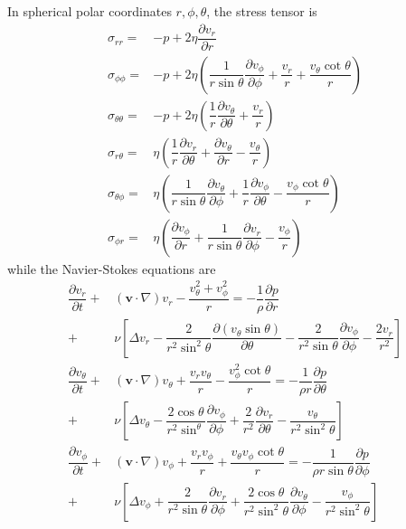 \documentclass[conference]{IEEEtran}
\theoremstyle{definition}
\theoremstyle{remark}
\begin{document}
    In spherical polar coordinates $r, \phi, \theta$, the stress tensor is
    \begin{equation}
        \begin{aligned}
            \sigma_{rr} =& -p + 2\eta \dfrac{\partial v_r}{\partial r} \\
            \sigma_{\phi\phi} =& -p + 2\eta \left( \dfrac1{r\sin \theta} \dfrac{\partial v_\phi}{\partial \phi} + \dfrac{v_r}{r} + \dfrac{v_\theta \cot \theta}{r} \right) \\
            \sigma_{\theta\theta} =& -p + 2\eta \left( \dfrac1r \dfrac{\partial v_\theta}{\partial \theta} + \dfrac{v_r}{r} \right) \\
            \sigma_{r\theta} =& \eta \left( \dfrac1r \dfrac{\partial v_r}{\partial \theta} + \dfrac{\partial v_\theta}{\partial r} - \dfrac{v_\theta}{r} \right) \\
            \sigma_{\theta\phi} =& \eta \left( \dfrac1{r\sin \theta} \dfrac{\partial v_\theta}{\partial \phi} + \dfrac1r \dfrac{\partial v_\phi}{\partial \theta} - \dfrac{v_\phi \cot \theta}{r} \right) \\
            \sigma_{\phi r} =& \eta \left( \dfrac{\partial v_\phi}{\partial r} + \dfrac1{r \sin \theta}\dfrac{\partial v_r}{\partial \phi} - \dfrac{v_\phi}{r} \right)
        \end{aligned}
    \end{equation}
    while the Navier-Stokes equations are
    \begin{align}
        \dfrac{\partial v_r}{\partial t} +& (\mathbf{v} \cdot \nabla) v_r - \dfrac{v_\theta^2 + v_\phi^2}r = -\dfrac1\rho \dfrac{\partial p}{\partial r} \nonumber \\
        +& \nu \left[ \Delta v_r - \dfrac2{r^2\sin^2\theta} \dfrac{\partial (v_\theta \sin\theta)}{\partial \theta} - \dfrac2{r^2\sin\theta} \dfrac{\partial v_\phi}{\partial \phi} - \dfrac{2v_r}{r^2} \right] \nonumber \\
        \dfrac{\partial v_\theta}{\partial t} +& (\mathbf{v} \cdot \nabla) v_\theta + \dfrac{v_r v_\theta}r - \dfrac{v_\phi^2 \cot \theta}r = -\dfrac1{\rho r} \dfrac{\partial p}{\partial \theta} \\
        +& \nu \left[ \Delta v_\theta - \dfrac{2\cos\theta}{r^2\sin^\theta} \dfrac{\partial v_\phi}{\partial \phi} + \dfrac2{r^2} \dfrac{\partial v_r}{\partial \theta} - \dfrac{v_\theta}{r^2 \sin^2 \theta} \right] \nonumber \\
        \dfrac{\partial v_\phi}{\partial t} +& (\mathbf{v} \cdot \nabla) v_\phi + \dfrac{v_r v_\phi}{r} + \dfrac{v_\theta v_\phi \cot \theta}r = -\dfrac1{\rho r \sin \theta} \dfrac{\partial p}{\partial \phi} \nonumber \\
        +& \nu \left[ \Delta v_\phi + \dfrac2{r^2\sin\theta} \dfrac{\partial v_r}{\partial \phi} + \dfrac{2\cos\theta}{r^2\sin^2\theta} \dfrac{\partial v_\theta}{\partial \phi} - \dfrac{v_\phi}{r^2 \sin^2\theta} \right] \nonumber
    \end{align}
\end{document}
